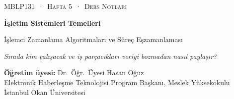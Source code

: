 \newcommand{\gantt}[2]{%
\begin{tikzpicture}[x=#1cm,y=1cm]
\foreach \p/\a/\b in {#2} {
  \fill[col\p] (\a,0) rectangle (\b,0.62);
  \draw[white,line width=1.2pt] (\a,0) -- (\a,0.62);
  \node[font=\small\bfseries,text=txt\p] at ({(\a+\b)/2},0.31) {\p};
  \draw[muted] (\a,0) -- (\a,-0.1) node[below,font=\scriptsize,text=muted,inner sep=1.5pt] {\a};
  \draw[muted] (\b,0) -- (\b,-0.1) node[below,font=\scriptsize,text=muted,inner sep=1.5pt] {\b};
}
\end{tikzpicture}}

\thispagestyle{empty}
\begin{tcolorbox}[enhanced,colback=dark,colframe=dark,arc=0pt,boxrule=0pt,
  left=18pt,right=18pt,top=20pt,bottom=20pt,coltext=white]
{\small\color{mint}\textsc{MBLP131 \,·\, Hafta 5 \,·\, Ders Notları}}\par\medskip
{\headfont\fontsize{26}{30}\selectfont\bfseries İşletim Sistemleri Temelleri}\par\medskip
{\large İşlemci Zamanlama Algoritmaları ve Süreç Eşzamanlaması}\par\smallskip
{\small\itshape\color{white!70} Sırada kim çalışacak ve iş parçacıkları veriyi bozmadan nasıl paylaşır?}
\end{tcolorbox}

\vspace{0.4em}
\begin{minipage}[t]{0.70\linewidth}
\small
\textbf{Öğretim üyesi:} Dr.\ Öğr.\ Üyesi Hasan Oğuz\\
Elektronik Haberleşme Teknolojisi Program Başkanı, Meslek Yüksekokulu\\
İstanbul Okan Üniversitesi
\end{minipage}

